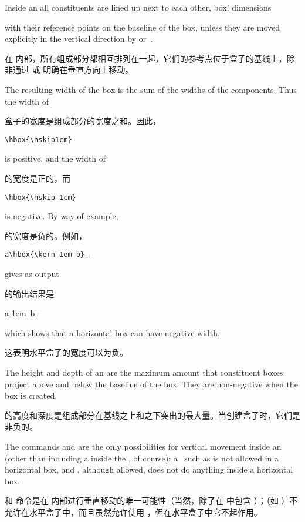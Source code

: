 Inside an  all constituents are lined up next to each other,
\term box! dimensions\par
with their reference points on the baseline of the box,
unless they are moved explicitly in the vertical direction
by  or~.

在  内部，所有组成部分都相互排列在一起，它们的参考点位于盒子的基线上，除非通过  或  明确在垂直方向上移动。

The resulting width of the box is the sum of the widths
of the components. Thus the width of

盒子的宽度是组成部分的宽度之和。因此，
\begin{verbatim}
\hbox{\hskip1cm}
\end{verbatim}
is positive, and the width of

的宽度是正的，而 

\begin{verbatim}
\hbox{\hskip-1cm}
\end{verbatim}
is negative. By way of example,

的宽度是负的。例如，


\begin{disp}\verb>a\hbox{\kern-1em b}-->\end{disp}
gives as output

的输出结果是
\begin{disp}\leavevmode\hphantom{b}a\hbox{\kern-1em b}--\end{disp}
which shows that a horizontal box can have negative
width.

这表明水平盒子的宽度可以为负。

The height and depth of an  are the
maximum amount that constituent boxes project above and
below the baseline of the box. They are non-negative when the
box is created.

 的高度和深度是组成部分在基线之上和之下突出的最大量。当创建盒子时，它们是非负的。

The commands  and  are the only possibilities
for vertical movement inside an  (other than
including a  inside the , of course);
a~ \ldash such as  \rdash 
is not allowed in a horizontal box, and
, although allowed,
does not do anything inside a horizontal box.

 和  命令是在  内部进行垂直移动的唯一可能性（当然，除了在  中包含 ）；（如 ）不允许在水平盒子中，而且虽然允许使用 ，但在水平盒子中它不起作用。


